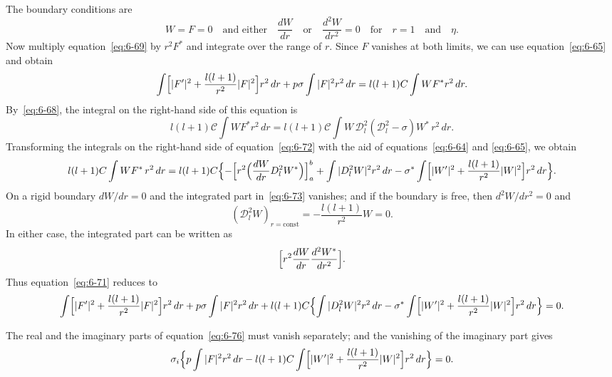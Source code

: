 The boundary conditions are
\begin{equation}\label{eq:6-70}
W = F = 0 \quad\text{and either}\quad\frac{dW}{dr} \quad\text{or}\quad \frac{d^2W}{dr^2} = 0 \quad\text{for}\quad r = 1\quad\text{and}\quad\eta.
\end{equation}
Now multiply equation~\eqref{eq:6-69} by $r^2 F^*$ and integrate over the range
of $r$. Since $F$ vanishes at both limits, we can use equation~\eqref{eq:6-65} and
obtain
\begin{equation}\label{eq:6-71}
\int\Bigl[|F'|^2 + \frac{l(l+1)}{r^2}|F|^2\Bigr]r^2\,dr + p\sigma\int|F|^2 r^2\,dr = l(l+1)\mathcal{C}\int WF^*r^2\,dr.
\end{equation}
By~\eqref{eq:6-68}, the integral on the right-hand side of this equation is
\begin{equation}\label{eq:6-72}
l(l+1)\mathcal{C}\int WF^*r^2\,dr = l(l+1)\mathcal{C}\int W\,\mathscr{D}_l^2(\mathscr{D}_l^2 - \sigma)W^*\,r^2\,dr.
\end{equation}
Transforming the integrals on the right-hand side of equation~\eqref{eq:6-72} with
the aid of equations~\eqref{eq:6-64} and \eqref{eq:6-65}, we obtain
\begin{equation}\label{eq:6-73}
l(l+1)\mathcal{C}\int W F^*\,r^2\,dr = l(l+1)\mathcal{C}\Bigl\{-\Bigl[r^2\Bigl(\frac{dW}{dr}\mathscr{D}_l^2 W^*\Bigr)\Bigr]_a^b + \int|\mathscr{D}_l^2 W|^2 r^2\,dr - \sigma^*\int\Bigl[|W'|^2+\frac{l(l+1)}{r^2}|W|^2\Bigr]r^2\,dr\Bigr\}.
\end{equation}
On a rigid boundary $dW/dr = 0$ and the integrated part in~\eqref{eq:6-73} vanishes;
and if the boundary is free, then $d^2 W/dr^2 = 0$ and
\begin{equation}\label{eq:6-74}
(\mathscr{D}_l^2 W)_{r=\text{const}} = -\frac{l(l+1)}{r^2}W = 0.
\end{equation}
In either case, the integrated part can be written as
\begin{equation}\label{eq:6-75}
\Bigl[r^2\frac{dW}{dr}\frac{d^2W^*}{dr^2}\Bigr].
\end{equation}
Thus equation~\eqref{eq:6-71} reduces to
\begin{equation}\label{eq:6-76}
\int\Bigl[|F'|^2 + \frac{l(l+1)}{r^2}|F|^2\Bigr]r^2\,dr + p\sigma\int|F|^2 r^2\,dr + l(l+1)\mathcal{C}\Bigl\{\int|\mathscr{D}_l^2 W|^2 r^2\,dr - \sigma^*\int\Bigl[|W'|^2+\frac{l(l+1)}{r^2}|W|^2\Bigr]r^2\,dr\Bigr\} = 0.
\end{equation}

The real and the imaginary parts of equation~\eqref{eq:6-76} must vanish separately;
and the vanishing of the imaginary part gives
\begin{equation}\label{eq:6-77}
\sigma_i\Bigl\{p\int|F|^2 r^2\,dr - l(l+1)\mathcal{C}\int\Bigl[|W'|^2+\frac{l(l+1)}{r^2}|W|^2\Bigr]r^2\,dr\Bigr\} = 0.
\end{equation}

